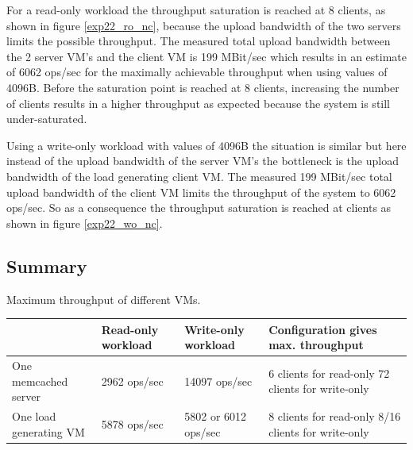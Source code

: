 \documentclass[11pt,a4paper]{article}
\begin{document}

For a read-only workload the throughput saturation is reached at 8 clients, as shown in figure \ref{exp22_ro_nc}, because the upload bandwidth of the two servers limits the possible throughput. The measured total upload bandwidth between the 2 server VM's and the client VM is 199 MBit/sec which results in an estimate of 6062 ops/sec for the maximally achievable throughput when using values of 4096B. Before the saturation point is reached at 8 clients, increasing the number of clients results in a higher throughput as expected because the system is still under-saturated. 

Using a write-only workload with values of 4096B the situation is similar but here instead of the upload bandwidth of the server VM's the bottleneck is the upload bandwidth of the load generating client VM. The measured 199 MBit/sec total upload bandwidth of the client VM limits the throughput of the system to 6062 ops/sec. So as a consequence  the throughput saturation is reached at  clients as shown in figure \ref{exp22_wo_nc}.


\subsection{Summary}


\begin{center}
	{Maximum throughput of different VMs.}
	\begin{tabular}{|l|p{2cm}|p{2cm}|p{4cm}|}
		\hline                        & Read-only workload & Write-only workload & Configuration gives max. throughput \\ 
		\hline One memcached server   & 2962 ops/sec       & 14097 ops/sec & 6 clients for read-only 72 clients for write-only\\ 
		\hline One load generating VM & 5878 ops/sec       &  5802 or 6012 ops/sec & 8 clients for read-only 8/16 clients for write-only\\ 
		\hline 
	\end{tabular}
\end{center}


\end{document}

